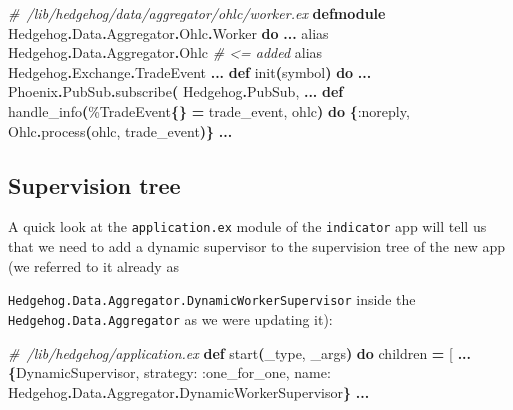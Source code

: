 \documentclass[
  oneside]{book}
\newenvironment{Shaded}{\begin{snugshade}}{\end{snugshade}}
\newcommand{\CommentTok}[1]{\textcolor[rgb]{0.56,0.35,0.01}{\textit{#1}}}
\newcommand{\ConstantTok}[1]{\textcolor[rgb]{0.56,0.35,0.01}{#1}}
\newcommand{\FunctionTok}[1]{\textcolor[rgb]{0.13,0.29,0.53}{\textbf{#1}}}
\newcommand{\ImportTok}[1]{#1}
\newcommand{\KeywordTok}[1]{\textcolor[rgb]{0.13,0.29,0.53}{\textbf{#1}}}
\newcommand{\NormalTok}[1]{#1}
\newcommand{\OperatorTok}[1]{\textcolor[rgb]{0.81,0.36,0.00}{\textbf{#1}}}
\newcommand{\OtherTok}[1]{\textcolor[rgb]{0.56,0.35,0.01}{#1}}
\newcommand{\VariableTok}[1]{\textcolor[rgb]{0.00,0.00,0.00}{#1}}
\begin{document}
\begin{Shaded}
\begin{Highlighting}[]
\CommentTok{\# /lib/hedgehog/data/aggregator/ohlc/worker.ex}
\KeywordTok{defmodule} \ConstantTok{Hedgehog}\OperatorTok{.}\ConstantTok{Data}\OperatorTok{.}\ConstantTok{Aggregator}\OperatorTok{.}\ConstantTok{Ohlc}\OperatorTok{.}\ConstantTok{Worker} \KeywordTok{do}
  \OperatorTok{...}
  \ImportTok{alias} \ConstantTok{Hedgehog}\OperatorTok{.}\ConstantTok{Data}\OperatorTok{.}\ConstantTok{Aggregator}\OperatorTok{.}\ConstantTok{Ohlc} \CommentTok{\# \textless{}= added}
  \ImportTok{alias} \ConstantTok{Hedgehog}\OperatorTok{.}\ConstantTok{Exchange}\OperatorTok{.}\ConstantTok{TradeEvent}
  \OperatorTok{...}
  \KeywordTok{def}\NormalTok{ init}\FunctionTok{(}\NormalTok{symbol}\FunctionTok{)} \KeywordTok{do}
    \OperatorTok{...}
    \ConstantTok{Phoenix}\OperatorTok{.}\ConstantTok{PubSub}\OperatorTok{.}\NormalTok{subscribe}\FunctionTok{(}
      \ConstantTok{Hedgehog}\OperatorTok{.}\ConstantTok{PubSub}\NormalTok{,}
  \OperatorTok{...}
  \KeywordTok{def}\NormalTok{ handle\_info}\FunctionTok{(}\NormalTok{\%}\ConstantTok{TradeEvent}\FunctionTok{\{\}} \OperatorTok{=}\NormalTok{ trade\_event, ohlc}\FunctionTok{)} \KeywordTok{do}
    \FunctionTok{\{}\VariableTok{:noreply}\NormalTok{, }\ConstantTok{Ohlc}\OperatorTok{.}\NormalTok{process}\FunctionTok{(}\NormalTok{ohlc, trade\_event}\FunctionTok{)\}}
    \OperatorTok{...}
\end{Highlighting}
\end{Shaded}

\subsection{Supervision tree}\label{supervision-tree-1}

A quick look at the \texttt{application.ex} module of the \texttt{indicator} app will tell us that we need to add a dynamic supervisor to the supervision tree of the new app (we referred to it already as

\texttt{Hedgehog.Data.Aggregator.DynamicWorkerSupervisor} inside the \texttt{Hedgehog.Data.Aggregator} as we were updating it):

\begin{Shaded}
\begin{Highlighting}[]
\CommentTok{\# /lib/hedgehog/application.ex}
  \KeywordTok{def}\NormalTok{ start}\FunctionTok{(}\NormalTok{\_type, \_args}\FunctionTok{)} \KeywordTok{do}
\NormalTok{    children }\OperatorTok{=} \OtherTok{[}
      \OperatorTok{...}
      \FunctionTok{\{}\ConstantTok{DynamicSupervisor}\NormalTok{,}
       \VariableTok{strategy:} \VariableTok{:one\_for\_one}\NormalTok{, }\VariableTok{name:} \ConstantTok{Hedgehog}\OperatorTok{.}\ConstantTok{Data}\OperatorTok{.}\ConstantTok{Aggregator}\OperatorTok{.}\ConstantTok{DynamicWorkerSupervisor}\FunctionTok{\}}
    \OperatorTok{...}
\end{Highlighting}
\end{Shaded}
\end{document}
